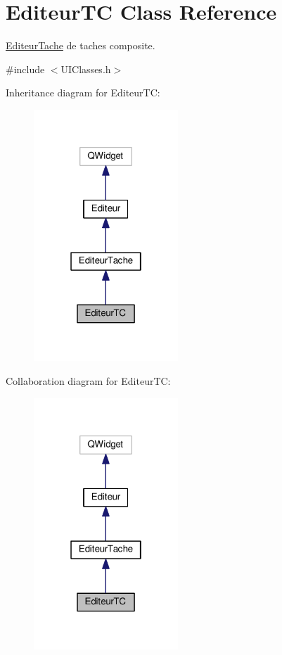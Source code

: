 \hypertarget{class_editeur_t_c}{}\section{Editeur\+T\+C Class Reference}
\label{class_editeur_t_c}


\hyperlink{class_editeur_tache}{Editeur\+Tache} de taches composite.  




{\ttfamily \#include $<$U\+I\+Classes.\+h$>$}



Inheritance diagram for Editeur\+T\+C\+:\nopagebreak
\begin{figure}[H]
\begin{center}
\leavevmode
\includegraphics[width=154pt]{class_editeur_t_c__inherit__graph}
\end{center}
\end{figure}


Collaboration diagram for Editeur\+T\+C\+:\nopagebreak
\begin{figure}[H]
\begin{center}
\leavevmode
\includegraphics[width=154pt]{class_editeur_t_c__coll__graph}
\end{center}
\end{figure}
